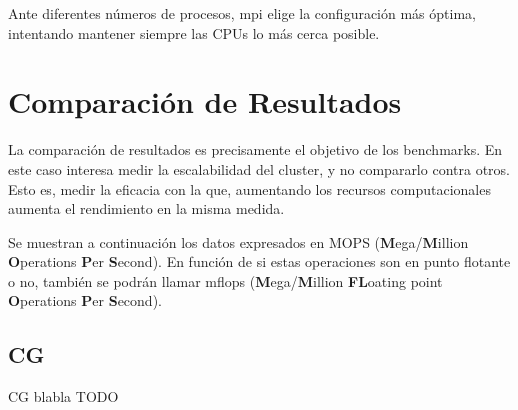 Ante diferentes números de procesos, \acrshort{mpi} elige la configuración más óptima, intentando mantener siempre las CPUs lo más cerca posible.

\section{Comparación de Resultados}
\label{sec:comparacion_resultados}
La comparación de resultados es precisamente el objetivo de los benchmarks. En este caso interesa medir la escalabilidad del cluster, y no compararlo contra otros. Esto es, medir la eficacia con la que, aumentando los recursos computacionales aumenta el rendimiento en la misma medida.

Se muestran a continuación los datos expresados en MOPS (\textbf{M}ega/\textbf{M}illion \textbf{O}perations \textbf{P}er \textbf{S}econd). En función de si estas operaciones son en punto flotante o no, también se podrán llamar \acrshort{mflops} (\textbf{M}ega/\textbf{M}illion \textbf{FL}oating point \textbf{O}perations \textbf{P}er \textbf{S}econd).

\subsection{CG}
CG blabla TODO


